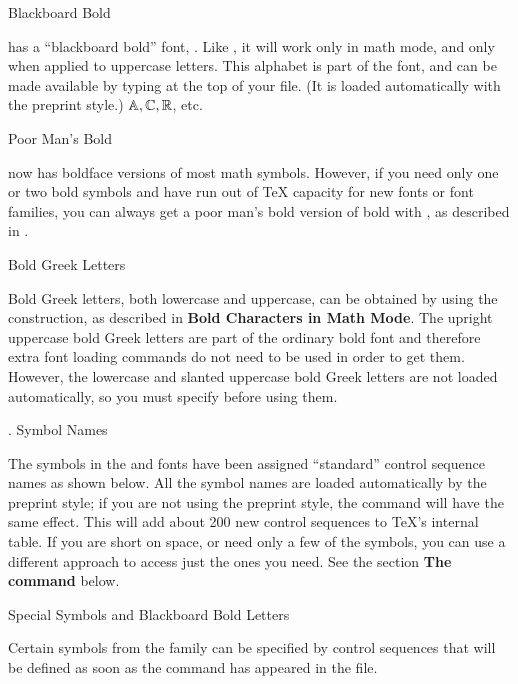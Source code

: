 \subhead Blackboard Bold \endsubhead

\AmSTeX{} has a ``blackboard bold'' font, .  Like ,
it will work only in math mode, and only when applied to uppercase
letters.  This alphabet is part of the  font, and can be
made available by typing  at the top of your file.  (It is
loaded automatically with the preprint style.)
\beginexample{\exboxwidth=3.75in}
 $\Bbb A, \Bbb C, \Bbb R$, etc.
\endexample


\subhead Poor Man's Bold \endsubhead

\AmSTeX{} now has boldface versions of most math symbols.  However, if you
need only one or two bold symbols and have run out of \TeX{} capacity for
new fonts or font families, you can always get a poor man's bold version
of bold with , as described in \Joy{}.


\subhead Bold Greek Letters \endsubhead

Bold Greek letters, both lowercase and uppercase, can be obtained by
using the  construction, as described in {\bf Bold
Characters in Math Mode}.  The upright uppercase bold Greek letters are
part of the ordinary bold font and therefore extra font loading commands
do not need to be used in order to get them.  However, the lowercase and
slanted uppercase bold Greek letters are not loaded automatically, so
you must specify  before using them.



. Symbol Names
\endhead

The symbols in the  and  fonts have been
assigned ``standard'' control sequence names as shown below.  All
the symbol names are loaded automatically by the preprint style; if
you are not using the preprint style, the command 
will have the same effect.
This will add about 200 new
control sequences to \TeX{}'s internal table.  If you are short on
space, or need only a few of the symbols, you can use a different
approach to access just the ones you need.  See the section {\bf The
 command} below.


\subhead Special Symbols and Blackboard Bold Letters
\endsubhead

Certain symbols from the  family can be specified by
control sequences that will be defined as soon as the command
 has appeared in the file.

